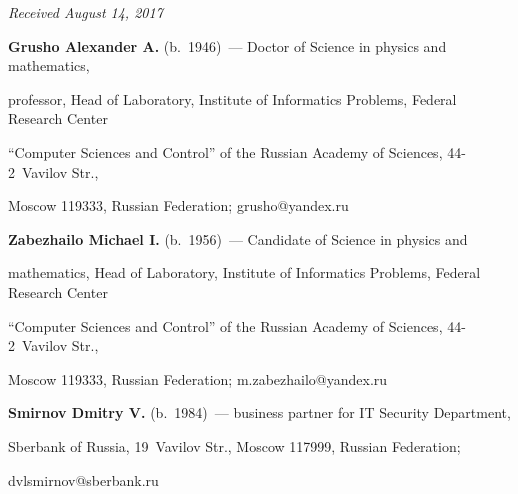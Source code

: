 \vspace*{-3pt}





\hfill{\small\textit{Received August 14, 2017}}





\Contr





\noindent


\textbf{Grusho Alexander A.} (b.\ 1946)~--- Doctor of Science in physics and mathematics, 


professor, Head of Laboratory, Institute of Informatics Problems, Federal Research Center 


``Computer Sciences and Control'' of the Russian Academy of Sciences, 44-2~Vavilov Str., 


Moscow 119333, Russian Federation; \mbox{grusho@yandex.ru}





\vspace*{3pt}


 


\noindent


\textbf{Zabezhailo Michael I.} (b.\ 1956)~--- Candidate of Science in physics and 


mathematics, Head of Laboratory, Institute of Informatics Problems, Federal Research Center 


``Computer Sciences and Control'' of the Russian Academy of Sciences, 44-2~Vavilov Str., 


Moscow 119333, Russian Federation; \mbox{m.zabezhailo@yandex.ru} 





\vspace*{3pt}


 


\noindent


\textbf{Smirnov Dmitry V.} (b.\ 1984)~--- business partner for IT Security Department, 


Sberbank of Russia, 19~Vavilov Str., Moscow 117999, Russian Federation; 


\mbox{dvlsmirnov@sberbank.ru} 





\vspace*{3pt}



